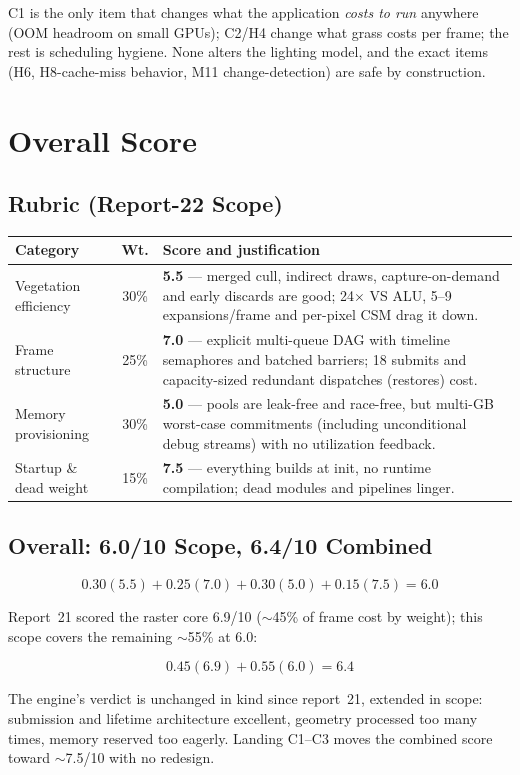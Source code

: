 \documentclass[11pt,a4paper]{article}
\begin{document}
C1 is the only item that changes what the application \emph{costs to run}
anywhere (OOM headroom on small GPUs); C2/H4 change what grass costs per
frame; the rest is scheduling hygiene. None alters the lighting model, and
the exact items (H6, H8-cache-miss behavior, M11 change-detection) are safe
by construction.

\section{Overall Score}
\label{sec:score22}

\subsection{Rubric (Report-22 Scope)}

\begin{table}[h]
\centering
\small
\begin{tabular}{@{}lcp{7.2cm}@{}}
\toprule
\textbf{Category} & \textbf{Wt.} & \textbf{Score and justification} \\
\midrule
Vegetation efficiency & 30\% & \textbf{5.5} --- merged cull, indirect draws,
capture-on-demand and early discards are good; 24$\times$ VS ALU, 5--9
expansions/frame and per-pixel CSM drag it down. \\
Frame structure & 25\% & \textbf{7.0} --- explicit multi-queue DAG with
timeline semaphores and batched barriers; 18 submits and capacity-sized
redundant dispatches (restores) cost. \\
Memory provisioning & 30\% & \textbf{5.0} --- pools are leak-free and
race-free, but multi-GB worst-case commitments (including unconditional
debug streams) with no utilization feedback. \\
Startup \& dead weight & 15\% & \textbf{7.5} --- everything builds at init,
no runtime compilation; dead modules and pipelines linger. \\
\bottomrule
\end{tabular}
\end{table}

\subsection{Overall: 6.0/10 Scope, 6.4/10 Combined}

\begin{equation}
0.30(5.5) + 0.25(7.0) + 0.30(5.0) + 0.15(7.5) = \mathbf{6.0}
\end{equation}

Report~21 scored the raster core 6.9/10 ($\sim$45\% of frame cost by weight);
this scope covers the remaining $\sim$55\% at 6.0:

\begin{equation}
0.45(6.9) + 0.55(6.0) = \mathbf{6.4}
\end{equation}

The engine's verdict is unchanged in kind since report~21, extended in
scope: submission and lifetime architecture excellent, geometry processed
too many times, memory reserved too eagerly. Landing C1--C3 moves the
combined score toward $\sim$7.5/10 with no redesign.
\end{document}

